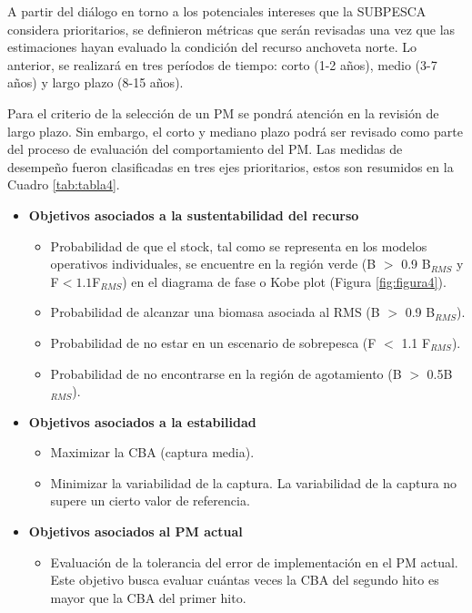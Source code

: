 
A partir del diálogo en torno a los potenciales intereses que la SUBPESCA considera prioritarios, se definieron métricas que serán revisadas una vez que las estimaciones hayan evaluado la condición del recurso anchoveta norte. Lo anterior, se realizará en tres períodos de tiempo: corto (1-2 años), medio (3-7 años) y largo plazo (8-15 años). 

Para el criterio de la selección de un PM se pondrá atención en la revisión de largo plazo. Sin embargo, el corto y mediano plazo podrá ser revisado como parte del proceso de evaluación del comportamiento del PM. Las medidas de desempeño fueron clasificadas en tres ejes prioritarios, estos son resumidos en la Cuadro \ref{tab:tabla4}.

\begin{itemize}
    \item \textbf{Objetivos asociados a la sustentabilidad del recurso}
    \begin{itemize}
        \item Probabilidad de que el stock, tal como se representa en los modelos operativos individuales, se encuentre en la región verde (B $>$ 0.9 B$_{RMS}$ y F$<1.1$F$_{RMS}$) en el diagrama de fase o Kobe plot (Figura \ref{fig:figura4}).
        \item Probabilidad de alcanzar una biomasa asociada al RMS (B $>$ 0.9 B$_{RMS}$).
        \item Probabilidad de no estar en un escenario de sobrepesca (F $<$ 1.1 F$_{RMS}$).
        \item Probabilidad de no encontrarse en la región de agotamiento (B $>$ 0.5B$_{RMS}$). 
    \end{itemize} 
    \item \textbf{Objetivos asociados a la estabilidad}
    \begin{itemize}
        \item Maximizar la CBA (captura media).
        \item Minimizar la variabilidad de la captura. La variabilidad de la captura no supere un cierto valor de referencia. 
    \end{itemize}
    \item \textbf{Objetivos asociados al PM actual}
    \begin{itemize}
        \item Evaluación de la tolerancia del error de implementación en el PM actual. Este objetivo busca evaluar cuántas veces la CBA del segundo hito es mayor que la CBA del primer hito.
    \end{itemize}
\end{itemize}

